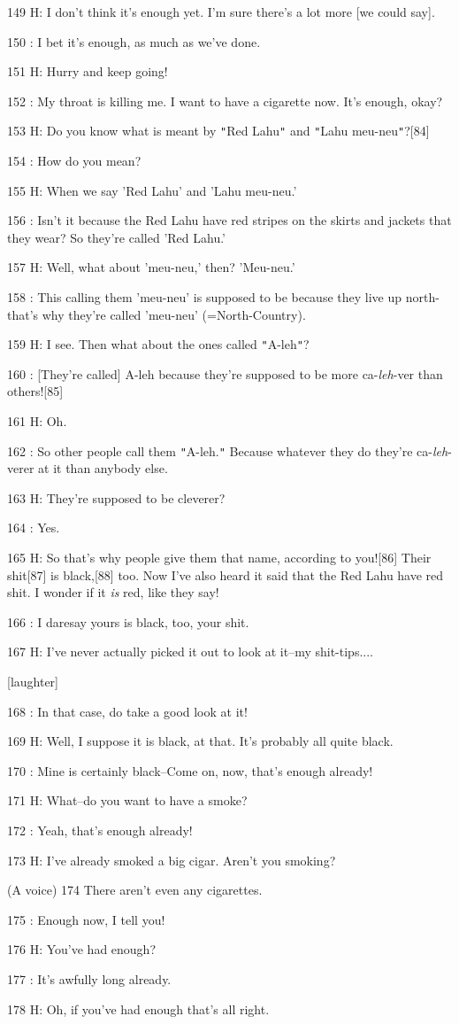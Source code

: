 149 H: I don't think it's enough yet. I'm sure there's a lot more [we could say].

150  : I bet it's enough, as much as we've done.

151 H: Hurry and keep going!

152  : My throat is killing me. I want to have a cigarette now. It's enough, okay?

153 H: Do you know what is meant by \texttt{"}Red Lahu\texttt{"} and \texttt{"}Lahu
meu-neu\texttt{"}?[84]

154  : How do you mean?

155 H: When we say 'Red Lahu' and 'Lahu meu-neu.'

156  : Isn't it because the Red Lahu have red stripes on the skirts and jackets
that they wear? So they're called 'Red Lahu.'

157 H: Well, what about 'meu-neu,' then? 'Meu-neu.'

158  : This calling them 'meu-neu' is supposed to be because they live up north-that's
why they're called 'meu-neu' (=North-Country).

159 H: I see. Then what about the ones called \texttt{"}A-leh\texttt{"}?

160  : [They're called] A-leh because they're supposed to be more ca-\textit{leh}-ver
than others![85]

161 H: Oh.

162  : So other people call them \texttt{"}A-leh.\texttt{"} Because whatever they
do they're ca-\textit{leh}-verer at it than anybody else.

163 H: They're supposed to be cleverer?

164  : Yes.

165 H: So that's why people give them that name, according to you![86] Their shit[87]
is black,[88] too. Now I've also heard it said that the Red Lahu have red shit.
I wonder if it \textit{is }red, like they say!

166  : I daresay yours is black, too, your shit.

167  H: I've never actually picked it out to look at it--my shit-tips....

[laughter]

168  : In that case, do take a good look at it!

169 H: Well, I suppose it is black, at that. It's probably all quite black.

170  : Mine is certainly black--Come on, now, that's enough already!

171 H: What--do you want to have a smoke?

172  : Yeah, that's enough already!

173 H: I've already smoked a big cigar. Aren't you smoking?

(A voice) 174 There aren't even any cigarettes.

175  : Enough now, I tell you!

176 H: You've had enough?

177  : It's awfully long already.

178 H: Oh, if you've had enough that's all right.

